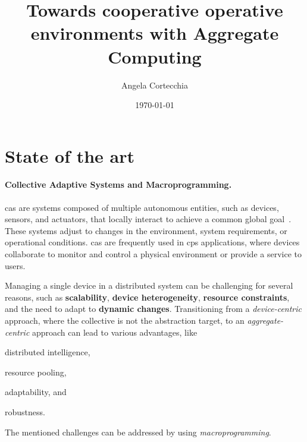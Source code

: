 \documentclass[12pt, a4paper]{article}
\newenvironment{inlinelist}{\begin{enumerate*}[label=\emph{(\roman*)}]}{\end{enumerate*}}
\begin{document}
\title{Towards cooperative operative environments with Aggregate Computing}
\author{Angela Cortecchia}
\date{\today}
\maketitle
%

\section{State of the art}\label{sec:state-of-the-art}
\sloppypar
\paragraph{Collective Adaptive Systems and Macroprogramming.}
\ac{cas} are systems composed of multiple autonomous entities, such as devices, sensors, and actuators,
that locally interact to achieve a common global goal~\cite{ferscha2015}.
%
These systems adjust to changes in the environment, system requirements, or operational conditions.
%
\ac{cas} are frequently used in \ac{cps} applications,
where devices collaborate to monitor and control a physical environment or provide a service to users.

Managing a single device in a distributed system can be challenging for several reasons,
such as \textbf{scalability}, \textbf{device heterogeneity},
\textbf{resource constraints}, and the need to adapt to \textbf{dynamic changes}.
%
Transitioning from a \emph{device-centric} approach,
where the collective is not the abstraction target,
to an \emph{aggregate-centric} approach can lead to various advantages, like
\begin{inlinelist}
    \item distributed intelligence,
    \item resource pooling,
    \item adaptability, and
    \item robustness.
\end{inlinelist}
%
The mentioned challenges can be addressed by using \emph{macroprogramming}.
\end{document}
